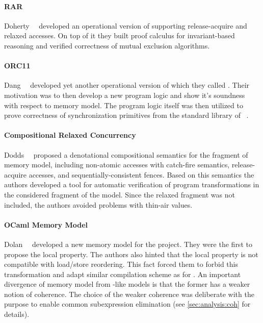 \paragraph{RAR}

Doherty~\etal~\cite{Doherty-al:PPoPP19} developed an 
operational version of \RCMM supporting 
release-acquire and relaxed accesses. 
On top of it they built proof calculus for 
invariant-based reasoning and verified 
correctness of mutual exclusion algorithms. 

\paragraph{ORC11}

Dang~\etal~\cite{Dang-al:POPL19} developed yet another 
operational version of \RCMM which they called \ORCMM. 
Their motivation was to then develop a 
new program logic and show it's soundness
with respect to \ORCMM memory model. 
The program logic itself was then utilized to 
prove correctness of synchronization primitives 
from the standard library of \Rust~\cite{RustBook:19}.

\paragraph{Compositional Relaxed Concurrency}

Dodds~\etal~\cite{Dodds-al:ESOP18} proposed a denotational 
compositional semantics for the fragment of \CMM memory model, 
including non-atomic accesses with catch-fire semantics, 
release-acquire accesses, and sequentially-consistent fences. 
Based on this semantics the authors developed 
a tool for automatic verification of program transformations
in the considered fragment of the \CMM model. 
Since the relaxed fragment was not included, 
the authors avoided problems with thin-air values. 

\paragraph{OCaml Memory Model}

Dolan~\etal~\cite{Dolan-al:PLDI18} developed a new 
memory model for the \MOCaml project. 
They were the first to propose the local \DRF property. 
The authors also hinted that the local \DRF property 
is not compatible with load/store reordering.
This fact forced them to forbid this transformation
and adapt similar compilation scheme as for \RCMM. 
An important divergence of \OCaml memory model 
from \CMM-like models is that the former 
has a weaker notion of coherence.
The choice of the weaker coherence was deliberate 
with the purpose to enable common subexpression elimination
(see \cref{sec:analysis:coh} for details).

